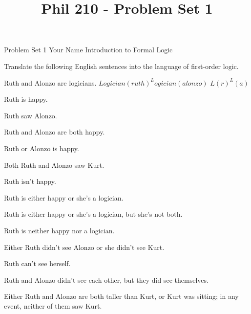 
\title{Phil 210 - Problem Set 1}

\heading
Problem Set 1
Your Name
Introduction to Formal Logic
\endheading

Translate the following English sentences into the language of first-order logic.

\problems
{}
Ruth and Alonzo are logicians.
	\answer
	$ Logician(ruth) ^ Logician(alonzo) $ \OR $L(r)^L(a)$
	\endanswer

Ruth is happy.
	\answer
	$ $
	\endanswer

Ruth saw Alonzo.
	\answer
	$ $
	\endanswer

Ruth and Alonzo are both happy.
	\answer
	$ $
	\endanswer

Ruth or Alonzo is happy.
	\answer
	$ $
	\endanswer

Both Ruth and Alonzo saw Kurt.
	\answer
	$ $
	\endanswer

Ruth isn't happy.
	\answer
	$ $
	\endanswer

Ruth is either happy or she's a logician.
	\answer
	$ $
	\endanswer

Ruth is either happy or she's a logician, but she's not both.
	\answer
	$ $
	\endanswer

Ruth is neither happy nor a logician.
	\answer
	$ $
	\endanswer

Either Ruth didn't see Alonzo or she didn't see Kurt.
	\answer
	$ $
	\endanswer

Ruth can't see herself.
	\answer
	$ $
	\endanswer

Ruth and Alonzo didn't see each other, but they did see themselves.
	\answer
	$ $
	\endanswer

Either Ruth and Alonzo are both taller than Kurt, or Kurt was sitting; in any event, neither of them saw Kurt.
	\answer
	$ $
	\endanswer

\endproblems
\bye
